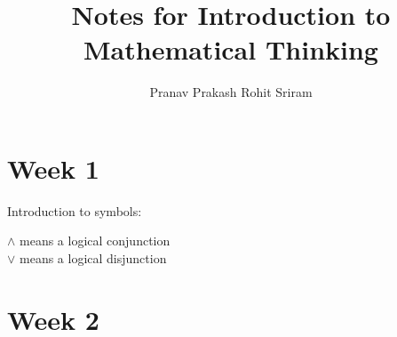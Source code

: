 \documentclass[]{article}
\begin{document}
\title{Notes for Introduction to Mathematical Thinking}
\author{Pranav Prakash \cr Rohit Sriram}
\maketitle

\section{Week 1}

Introduction to symbols:

\begin{center}

\begin{framed}
	$\wedge$ means a logical conjunction \\
 	$\vee$ means a logical disjunction
\end{framed}

\end{center}


\section{Week 2}
\end{document}
